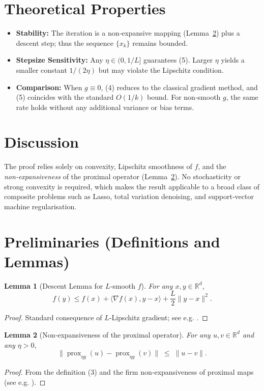 \documentclass{article}
\newtheorem{lemma}{Lemma}
\newcommand{\prox}{\operatorname{prox}}
\newcommand{\R}{\mathbb{R}}
\begin{document}
\section*{Theoretical Properties}
\begin{itemize}[noitemsep]
  \item \textbf{Stability:} The iteration is a non‑expansive mapping (Lemma~\ref{lem:nonexp}) plus a descent step; thus the sequence $\{x_{k}\}$ remains bounded.
  \item \textbf{Stepsize Sensitivity:} Any $\eta\in(0,1/L]$ guarantees (5). Larger $\eta$ yields a smaller constant $1/(2\eta)$ but may violate the Lipschitz condition.
  \item \textbf{Comparison:} When $g\equiv0$, (4) reduces to the classical gradient method, and (5) coincides with the standard $O(1/k)$ bound. For non‑smooth $g$, the same rate holds without any additional variance or bias terms.
\end{itemize}

\section*{Discussion}
The proof relies solely on convexity, Lipschitz smoothness of $f$, and the \emph{non‑expansiveness} of the proximal operator (Lemma~\ref{lem:nonexp}). No stochasticity or strong convexity is required, which makes the result applicable to a broad class of composite problems such as Lasso, total variation denoising, and support‑vector machine regularisation.

\newpage
\section*{Preliminaries (Definitions and Lemmas)}

\begin{lemma}[Descent Lemma for $L$‑smooth $f$]\label{lem:descent}
For any $x,y\in\R^{d}$,
\[
f(y)\le f(x)+\langle\nabla f(x),y-x\rangle+\frac{L}{2}\|y-x\|^{2}.
\tag{6}
\]
\end{lemma}
\begin{proof}
Standard consequence of $L$‑Lipschitz gradient; see e.g. \cite{nesterov2004introductory}.
\end{proof}

\begin{lemma}[Non‑expansiveness of the proximal operator]\label{lem:nonexp}
For any $u,v\in\R^{d}$ and any $\eta>0$,
\[
\big\|\prox_{\eta g}(u)-\prox_{\eta g}(v)\big\|
\;\le\; \|u-v\|.
\tag{7}
\]
\end{lemma}
\begin{proof}
From the definition (3) and the firm non‑expansiveness of proximal maps (see e.g. \cite{bauschke2011convex}).
\end{proof}
\end{document}
